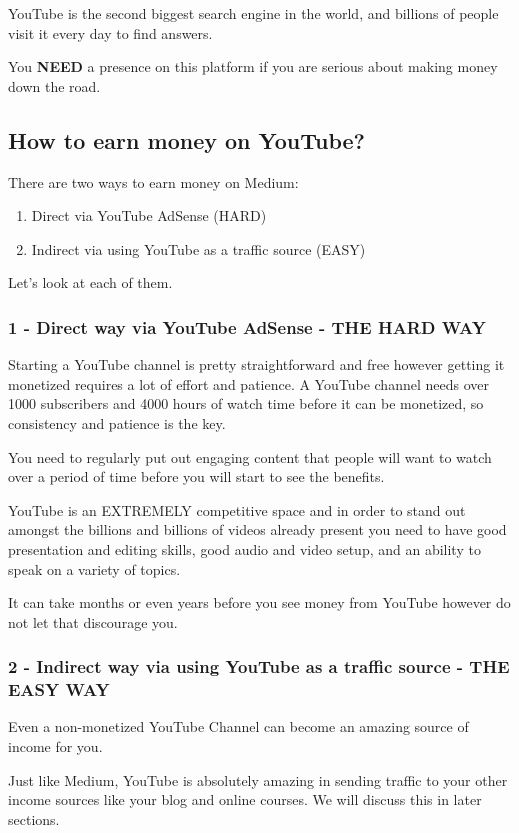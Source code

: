 \documentclass[11pt]{article}
\begin{document}
YouTube is the second biggest search engine in the world, and billions of people visit it every day to find answers.

You \textbf{NEED} a presence on this platform if you are serious about making money down the road.

\subsection*{How to earn money on YouTube?}
There are two ways to earn money on Medium:

\begin{enumerate}
\item Direct via YouTube AdSense (HARD)
\item Indirect via using YouTube as a traffic source (EASY)
\end{enumerate}

Let's look at each of them.

\subsubsection*{1 - Direct way via YouTube AdSense - THE HARD WAY}
Starting a YouTube channel is pretty straightforward and free however getting it monetized requires a lot of effort and patience. A YouTube channel needs over 1000 subscribers and 4000 hours of watch time before it can be monetized, so consistency and patience is the key.

You need to regularly put out engaging content that people will want to watch over a period of time before you will start to see the benefits.

YouTube is an EXTREMELY competitive space and in order to stand out amongst the billions and billions of videos already present you need to have good presentation and editing skills, good audio and video setup, and an ability to speak on a variety of topics.

It can take months or even years before you see money from YouTube however do not let that discourage you.

\subsubsection*{2 - Indirect way via using YouTube as a traffic source - THE EASY WAY}
Even a non-monetized YouTube Channel can become an amazing source of income for you.

Just like Medium, YouTube is absolutely amazing in sending traffic to your other income sources like your blog and online courses. We will discuss this in later sections.
\end{document}
